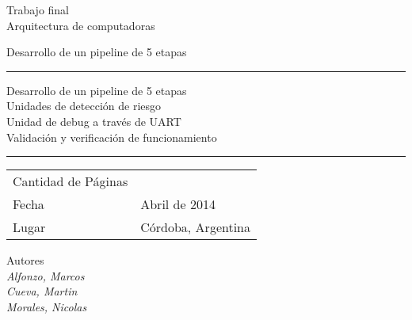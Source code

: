 \thispagestyle{empty}
{\Huge \noindent Trabajo final\\ Arquitectura de computadoras}

\vspace{1cm}

{\Large \noindent Desarrollo de un pipeline de 5 etapas}
                  
\vspace{5cm}
\hrule                  
\vspace{0.2cm}
{\noindent Desarrollo de un pipeline de 5 etapas\bigskip
\\Unidades de detecci\'on de riesgo\bigskip
\\Unidad de debug a trav\'es de UART\bigskip
\\Validaci\'on y verificaci\'on de funcionamiento}
\vspace{0.2cm}
\hrule 


\vfill
\Large
\begin{center}
  \begin{tabular}{| p{5cm} | p{7cm} |}
    \hline
    Cantidad de Páginas    & \pageref{LastPage}  \\
    Fecha                  & Abril de 2014\\
    Lugar                  & Córdoba, Argentina\\  
    \hline    
    \end{tabular}
\end{center}

\bigskip
	Autores\\
    \textit{Alfonzo, Marcos}\\
    \textit{Cueva, Martin}\\	
    \textit{Morales, Nicolas}

\newpage

